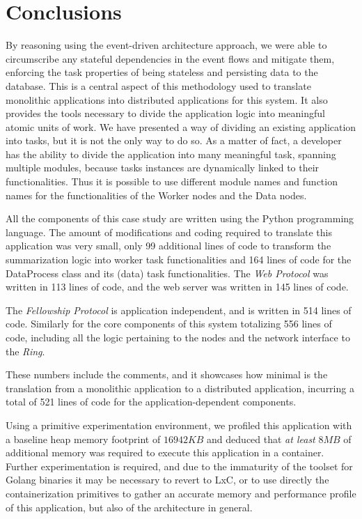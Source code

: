 \documentclass[12pt, titlepage]{uo_temp}
\begin{document}
     \section{Conclusions}
     By reasoning using the event-driven architecture approach, we were able to
     circumscribe any stateful dependencies in the event flows and mitigate them,
     enforcing the task properties of being stateless and persisting data to the
     database. This is a central aspect of this methodology used to translate monolithic
     applications into distributed applications for this system. It also provides the
     tools necessary to divide the application logic into meaningful atomic units of
     work. We have presented a way of dividing an existing application into tasks, but it
     is not the only way to do so. As a matter of fact, a developer has the ability to
     divide the application into many meaningful task, spanning multiple modules, because
     tasks instances are dynamically linked to their functionalities. Thus it is possible
     to use different module names and function names for the functionalities of the
     Worker nodes and the Data nodes.

     All the components of this case study are written using the Python programming
     language. The amount of modifications and coding required to translate this
     application was very small, only 99 additional lines of code to transform the
     summarization logic into worker task functionalities and 164 lines of code for the
     DataProcess class and its (data) task functionalities. The \emph{Web Protocol} was
     written in 113 lines of code, and the web server was written in 145 lines of code.

     The \emph{Fellowship Protocol} is application independent, and is written in 514
     lines of code. Similarly for the core components of this system totalizing 556 lines
     of code, including all the logic pertaining to the nodes and the network interface to
     the \emph{Ring}.

     These numbers include the comments, and it showcases how minimal is the translation
     from a monolithic application to a distributed application, incurring a total of 521
     lines of code for the application-dependent components.

     Using a primitive experimentation environment, we profiled this application with a
     baseline heap memory footprint of $16942KB$ and deduced that \emph{at least} $8MB$ of
     additional memory was required to execute this application in a container. Further
     experimentation is required, and due to the immaturity of the toolset for Golang
     binaries it may be necessary to revert to LxC, or to use directly the
     containerization primitives to gather an accurate memory and performance profile of
     this application, but also of the architecture in general.
\end{document}
